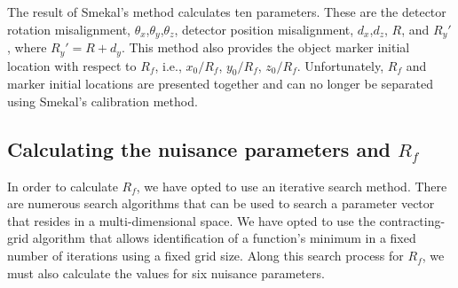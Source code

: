 The result of Smekal's method calculates ten parameters.  These are the detector rotation misalignment, $\theta_x$,$\theta_y$,$\theta_z$, detector position misalignment, $d_x$,$d_z$, $R$, and $R_y'$, where $R_y' = R + d_y$.  This method also provides the object marker initial location with respect to $R_f$, i.e., $x_0/R_f$, $y_0/R_f$, $z_0/R_f$.  Unfortunately, $R_f$ and marker initial locations are presented together and can no longer be separated using Smekal's calibration method.


\subsection{Calculating the nuisance parameters and $R_{f}$}
In order to calculate $R_{f}$, we have opted to use an iterative search method.  There are numerous search algorithms that can be used to search a parameter vector that resides in a multi-dimensional space.  We have opted to use the contracting-grid algorithm that allows identification of a function's minimum in a fixed number of iterations using a fixed grid size.  Along this search process for $R_f$, we must also calculate the values for six nuisance parameters.  

